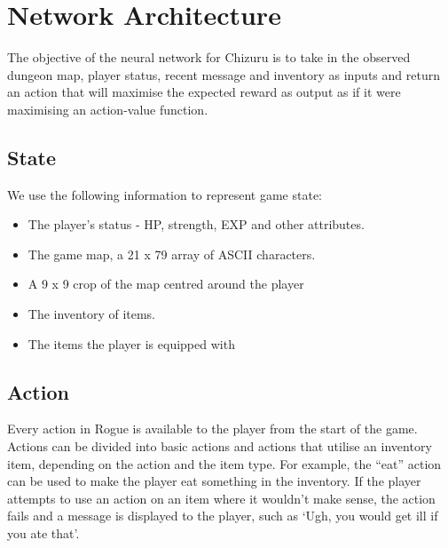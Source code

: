 \documentclass[12pt,a4paper]{article}
\begin{document}



    \section{Network Architecture}\label{sec:network-architecture}

    The objective of the neural network for Chizuru is to take in the observed dungeon map, player status, recent message and inventory as inputs and return an action that will maximise the expected reward as output as if it were maximising an action-value function.

    \subsection{State}\label{subsec:state}

    We use the following information to represent game state:
    \begin{itemize}
        \item The player's status - HP, strength, EXP and other attributes.
        \item The game map, a 21 x 79 array of ASCII characters.
        \item A 9 x 9 crop of the map centred around the player
        \item The inventory of items.
        \item The items the player is equipped with
    \end{itemize}

    \subsection{Action}\label{subsec:action}

    Every action in Rogue is available to the player from the start of the game.
    Actions can be divided into basic actions and actions that utilise an inventory item, depending on the action and the item type.
    For example,
    the ``eat'' action can be used to make the player eat something in the inventory.
    If the player attempts to use an action on an item where it wouldn't make sense, the action fails and a message is displayed to the player, such as `Ugh, you would get ill if you ate that'.
\end{document}
